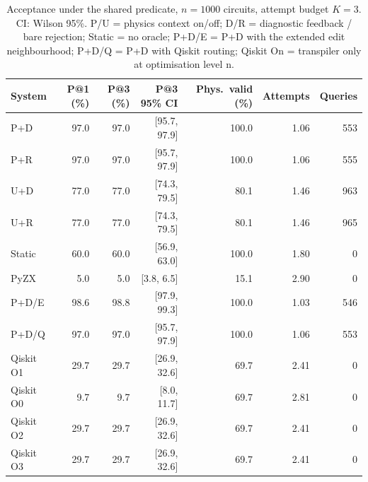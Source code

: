 \begin{table}[t]
\centering
\caption{Acceptance under the shared predicate, $n=1000$ circuits, attempt budget $K=3$. CI: Wilson 95\%. P/U = physics context on/off; D/R = diagnostic feedback / bare rejection; Static = no oracle; P+D/E = P+D with the extended edit neighbourhood; P+D/Q = P+D with Qiskit routing; Qiskit On = transpiler only at optimisation level n.}
\label{tab:rates}
\footnotesize
\setlength{\tabcolsep}{3pt}
\begin{tabular}{lrrrrrr}
\toprule
System & P@1 (\%) & P@3 (\%) & P@3 95\% CI & Phys.\ valid (\%) & Attempts & Queries \\
\midrule
P+D & 97.0 & 97.0 & [95.7, 97.9] & 100.0 & 1.06 & 553 \\
P+R & 97.0 & 97.0 & [95.7, 97.9] & 100.0 & 1.06 & 555 \\
U+D & 77.0 & 77.0 & [74.3, 79.5] & 80.1 & 1.46 & 963 \\
U+R & 77.0 & 77.0 & [74.3, 79.5] & 80.1 & 1.46 & 965 \\
Static & 60.0 & 60.0 & [56.9, 63.0] & 100.0 & 1.80 & 0 \\
PyZX & 5.0 & 5.0 & [3.8, 6.5] & 15.1 & 2.90 & 0 \\
P+D/E & 98.6 & 98.8 & [97.9, 99.3] & 100.0 & 1.03 & 546 \\
P+D/Q & 97.0 & 97.0 & [95.7, 97.9] & 100.0 & 1.06 & 553 \\
Qiskit O1 & 29.7 & 29.7 & [26.9, 32.6] & 69.7 & 2.41 & 0 \\
Qiskit O0 & 9.7 & 9.7 & [8.0, 11.7] & 69.7 & 2.81 & 0 \\
Qiskit O2 & 29.7 & 29.7 & [26.9, 32.6] & 69.7 & 2.41 & 0 \\
Qiskit O3 & 29.7 & 29.7 & [26.9, 32.6] & 69.7 & 2.41 & 0 \\
\bottomrule
\end{tabular}
\end{table}
